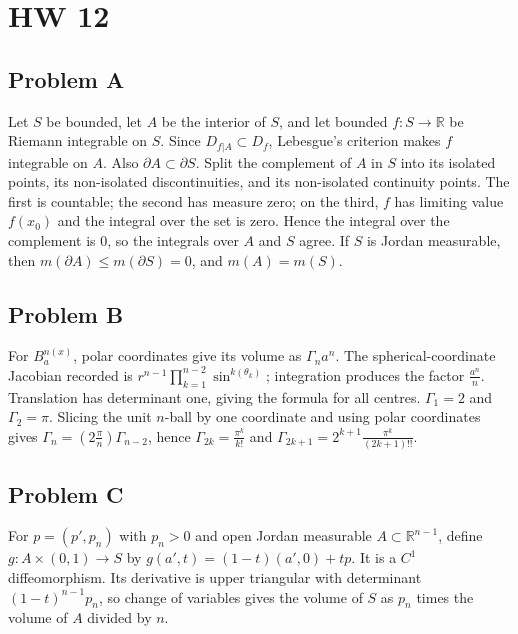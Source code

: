 \chapter{HW 12}

\section{Problem A}

Let \(S\) be bounded, let \(A\) be the interior of \(S\), and let bounded \(f:S\rightarrow\mathbb{R}\) be Riemann integrable on \(S\). Since \(D_{f|A} \subset D_{f}\), Lebesgue's criterion makes \(f\) integrable on \(A\). Also \(\partial A \subset \partial S\). Split the complement of \(A\) in \(S\) into its isolated points, its non-isolated discontinuities, and its non-isolated continuity points. The first is countable; the second has measure zero; on the third, \(f\) has limiting value \(f\left( x_{0} \right)\) and the integral over the set is zero. Hence the integral over the complement is \(0\), so the integrals over \(A\) and \(S\) agree. If \(S\) is Jordan measurable, then \(m\left( {\partial A} \right) \leq m\left( {\partial S} \right) = 0\), and \(m(A) = m(S)\).

\section{Problem B}

For \(B_{a}^{n{(x)}}\), polar coordinates give its volume as \(\Gamma_{n}a^{n}\). The spherical-coordinate Jacobian recorded is \(r^{n - 1}\prod_{k = 1}^{n - 2}\sin^{k{(\theta_{k})}}\); integration produces the factor \(\frac{a^{n}}{n}\). Translation has determinant one, giving the formula for all centres. \(\Gamma_{1} = 2\) and \(\Gamma_{2} = \pi\). Slicing the unit \(n\)-ball by one coordinate and using polar coordinates gives \(\Gamma_{n} = \left( {2\frac{\pi}{n}} \right)\Gamma_{n - 2}\), hence \(\Gamma_{2k} = \frac{\pi^{k}}{k!}\) and \(\Gamma_{2k + 1} = 2^{k + 1}\frac{\pi^{k}}{\left( {2k + 1} \right)!!}\).

\section{Problem C}

For \(p = \left( {p',p_{n}} \right)\) with \(p_{n} > 0\) and open Jordan measurable \(A \subset \mathbb{R}^{n - 1}\), define \(g:A \times \left( {0,1} \right)\rightarrow S\) by \(g\left( {a',t} \right) = \left( {1 - t} \right)\left( {a',0} \right) + tp\). It is a \(C^{1}\) diffeomorphism. Its derivative is upper triangular with determinant \(\left( {1 - t} \right)^{n - 1}p_{n}\), so change of variables gives the volume of \(S\) as \(p_{n}\) times the volume of \(A\) divided by \(n\).

